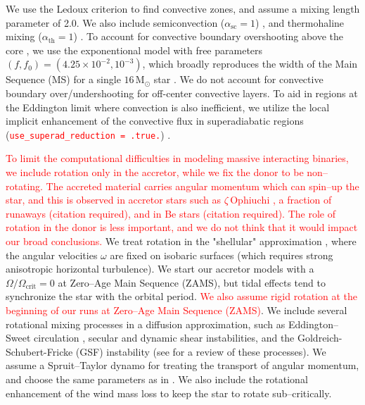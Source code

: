 \documentclass[linenumbers,trackchanges,twocolumn]{aastex701}
\newcommand{\Mdot}{\mathrm{M}_{\odot}}
\newcommand{\red}{\textcolor{red}}
\begin{document}
We use the Ledoux criterion \citep{1947ApJ...105..305L} to find convective zones, and assume a mixing length parameter of 2.0. We also include semiconvection ($\alpha_{\mathrm{sc}}=1$) \citep{1983A&A...126..207L}, and thermohaline mixing ($\alpha_{\mathrm{th}}=1$) \citep{1980A&A....91..175K}. To account for convective boundary overshooting above the core \citep{2000A&A...360..952H,2018ApJ...859..100C}, we use the exponentional model with free parameters $(f,f_0) = (4.25 \times 10^{-2}, 10^{-3})$, which broadly reproduces the width of the Main Sequence (MS) for a single $16 \, \Mdot$ star \citep{2011A&A...530A.115B}. We do not account for convective boundary over/undershooting for off-center convective layers. To aid in regions at the Eddington limit where convection is also inefficient, we utilize the local implicit enhancement of the convective flux in superadiabatic regions (\texttt{\red{use\_superad\_reduction = .true.}}) \citep{2023ApJS..265...15J}.

\red{To limit the computational difficulties in modeling massive interacting binaries, we include rotation only in the accretor, while we fix the donor to be non--rotating. The accreted material carries angular momentum which can spin--up the star, and this is observed in accretor stars such as $\zeta\, \mathrm{Ophiuchi}$ \citep{2018AN....339...46Z, 2021ApJ...923..277R}, a fraction of runaways (citation required), and in Be stars (citation required). The role of rotation in the donor is less important, and we do not think that it would impact our broad conclusions.} We treat rotation in the "shellular" approximation \citep{1992A&A...265..115Z,2012A&A...537A.146E}, where the angular velocities $\omega$ are fixed on isobaric surfaces (which requires strong anisotropic horizontal turbulence). We start our accretor models with a $\Omega/\Omega_{\mathrm{crit}} = 0$ at Zero--Age Main Sequence (ZAMS), but tidal effects tend to synchronize the star with the orbital period. \red{We also assume rigid rotation at the beginning of our runs at Zero--Age Main Sequence (ZAMS)}. We include several rotational mixing processes in a diffusion approximation, such as Eddington--Sweet circulation \citep{1950MNRAS.110..548S}, secular and dynamic shear instabilities, and the Goldreich-Schubert-Fricke (GSF) instability (see \citep{2000ApJ...528..368H} for a review of these processes). We assume a Spruit--Taylor dynamo \citep{2002A&A...381..923S} for treating the transport of angular momentum, and choose the same parameters as in \citep{2000ApJ...528..368H}. We also include the rotational enhancement of the wind mass loss \citep{1998A&A...329..551L} to keep the star to rotate sub--critically.
\end{document}
